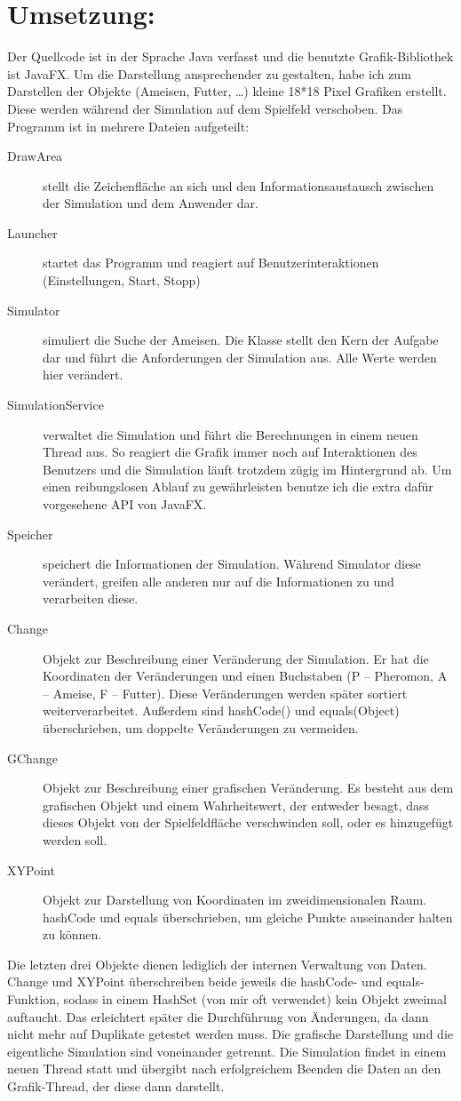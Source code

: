 \documentclass[a4paper,12pt]{scrartcl}
\begin{document}
\section*{Umsetzung:}
Der Quellcode ist in der Sprache Java verfasst und die benutzte Grafik-Bibliothek ist JavaFX.
Um die Darstellung ansprechender zu gestalten, habe ich zum Darstellen der Objekte (Ameisen, Futter, \dots) kleine 18*18 Pixel Grafiken erstellt. Diese werden während der Simulation auf dem Spielfeld verschoben.
Das Programm ist in mehrere Dateien aufgeteilt:
\begin{description}
 \item[DrawArea] stellt die Zeichenfläche an sich und den Informationsaustausch zwischen der Simulation und dem Anwender dar.
 \item[Launcher] startet das Programm und reagiert auf Benutzerinteraktionen (Einstellungen, Start, Stopp)
 \item[Simulator] simuliert die Suche der Ameisen. Die Klasse stellt den Kern der Aufgabe dar und führt die Anforderungen der Simulation aus. Alle Werte werden hier verändert.
 \item[SimulationService] verwaltet die Simulation und führt die Berechnungen in einem neuen Thread aus. So reagiert die Grafik immer noch auf Interaktionen des Benutzers und die Simulation läuft trotzdem zügig im Hintergrund ab. Um einen reibungslosen Ablauf zu gewährleisten benutze ich die extra dafür vorgesehene API von JavaFX.
 \item[Speicher] speichert die Informationen der Simulation. Während Simulator diese verändert, greifen alle anderen nur auf die Informationen zu und verarbeiten diese.
 \item[Change] Objekt zur Beschreibung einer Veränderung der Simulation. Er hat die Koordinaten der Veränderungen und einen Buchstaben (P -- Pheromon, A -- Ameise, F -- Futter). Diese Veränderungen werden später sortiert weiterverarbeitet. Außerdem sind hashCode() und equals(Object) überschrieben, um doppelte Veränderungen zu vermeiden.
 \item[GChange] Objekt zur Beschreibung einer grafischen Veränderung. Es besteht aus dem grafischen Objekt und einem Wahrheitswert, der entweder besagt, dass dieses Objekt von der Spielfeldfläche verschwinden soll, oder es hinzugefügt werden soll.
 \item[XYPoint] Objekt zur Darstellung von Koordinaten im zweidimensionalen Raum. hashCode und equals überschrieben, um gleiche Punkte auseinander halten zu können.
\end{description}
Die letzten drei Objekte dienen lediglich der internen Verwaltung von Daten. Change und XYPoint überschreiben beide jeweils die hashCode- und equals-Funktion, sodass in einem HashSet (von mir oft verwendet) kein Objekt zweimal auftaucht. Das erleichtert später die Durchführung von Änderungen, da dann nicht mehr auf Duplikate getestet werden muss.
Die grafische Darstellung und die eigentliche Simulation sind voneinander getrennt. Die Simulation findet in einem neuen Thread statt und übergibt nach erfolgreichem Beenden die Daten an den Grafik-Thread, der diese dann darstellt. 
\end{document}
